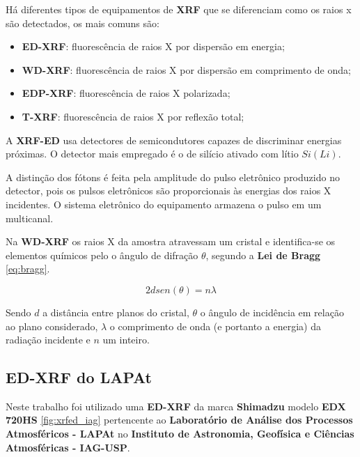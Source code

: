 Há diferentes tipos de equipamentos de \textbf{XRF} que se diferenciam 
como os raios x são detectados, os mais comuns são:

\begin{itemize}
  \item \textbf{ED-XRF}: fluorescência de raios X por dispersão em energia;
  \item \textbf{WD-XRF}: fluorescência de raios X por dispersão em comprimento de onda;
  \item \textbf{EDP-XRF}: fluorescência de raios X polarizada;
  \item \textbf{T-XRF}: fluorescência de raios X por reflexão total;
\end{itemize}


A \textbf{XRF-ED} usa detectores de semicondutores capazes de
discriminar energias próximas. 
O detector mais empregado é o de silício ativado com lítio $Si(Li)$. 

A distinção dos fótons é feita pela amplitude do pulso 
eletrônico produzido no detector, pois os pulsos eletrônicos são
proporcionais às energias dos raios X incidentes. O sistema eletrônico do 
equipamento armazena o pulso em um multicanal.


Na \textbf{WD-XRF} os raios X da amostra atravessam um cristal 
e identifica-se os elementos químicos pelo o ângulo de difração $\theta$, segundo 
a \textbf{Lei de Bragg} \ref{eq:bragg}. 

\begin{equation}
  \label{eq:bragg}
  2d sen(\theta) = n \lambda
\end{equation}

Sendo $d$ a distância entre planos do cristal, $\theta$ o ângulo de incidência em 
relação ao plano considerado, $\lambda$ o comprimento de onda (e portanto a energia) 
da radiação incidente e $n$ um inteiro. 

\subsection{\textbf{ED-XRF} do \textbf{LAPAt}}

Neste trabalho foi utilizado uma \textbf{ED-XRF} da marca \textbf{Shimadzu} 
modelo \textbf{EDX 720HS} \ref{fig:xrfed_iag} pertencente ao 
\textbf{Laboratório de Análise dos Processos Atmosféricos - LAPAt}
no \textbf{Instituto de Astronomia, Geofísica e Ciências Atmosféricas - IAG-USP}.

